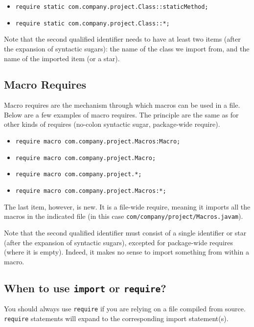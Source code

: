 \begin{itemize}
\item \texttt{require static com.company.project.Class::staticMethod;}
\item \texttt{require static com.company.project.Class::*;}
\end{itemize}

Note that the second qualified identifier needs to have at least two items
(after the expansion of syntactic sugars): the name of the class we import from,
and the name of the imported item (or a star).

\subsection{Macro Requires}

Macro requires are the mechanism through which macros can be used in a file.
Below are a few examples of macro requires. The principle are the same as for
other kinds of requires (no-colon syntactic sugar, package-wide require).

\begin{itemize}
\item \texttt{require macro com.company.project.Macros:Macro;}
\item \texttt{require macro com.company.project.Macro;}
\item \texttt{require macro com.company.project.*;}
\item \texttt{require macro com.company.project.Macros:*;}
\end{itemize}

The last item, however, is new. It is a file-wide require, meaning it imports
all the macros in the indicated file (in this case
\texttt{com/company/project/Macros.javam}).

Note that the second qualified identifier must consist of a single identifier or
star (after the expansion of syntactic sugars), excepted for package-wide
requires (where it is empty). Indeed, it makes no sense to import something from
within a macro.

\subsection{When to use \texttt{import} or \texttt{require}?}

You should always use \texttt{require} if you are relying on a file compiled
from source. \texttt{require} statements will expand to the corresponding import
statement(s).

